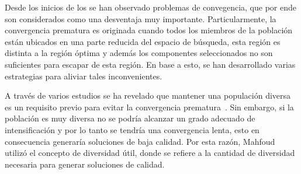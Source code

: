 Desde los inicios de los \EAS{} se han observado problemas de convegencia, que por ende son considerados como una desventaja muy importante\cite{Crepinsek:13}.
%
Particularmente, la convergencia prematura es originada cuando todos los miembros de la población están ubicados en una parte reducida del espacio de búsqueda, esta región es distinta a la región óptima y además los componentes seleccionados no son suficientes para escapar de esta región.
%
En base a esto, se han desarrollado varias estrategias para aliviar tales inconvenientes.
%


A través de varios estudios se ha revelado que mantener una populación diversa es un requisito previo para evitar la convergencia prematura~\cite{Crepinsek:13}.
%
Sin embargo, si la población es muy diversa no se podría alcanzar un grado adecuado de intensificación y por lo tanto se tendría una convergencia lenta, esto en consecuencia generaría soluciones de baja calidad.
%
Por esta razón, Mahfoud~\cite{dasgupta2013evolutionary} utilizó el concepto de diversidad útil, donde se refiere a la cantidad de diversidad necesaria para generar soluciones de calidad.
%

